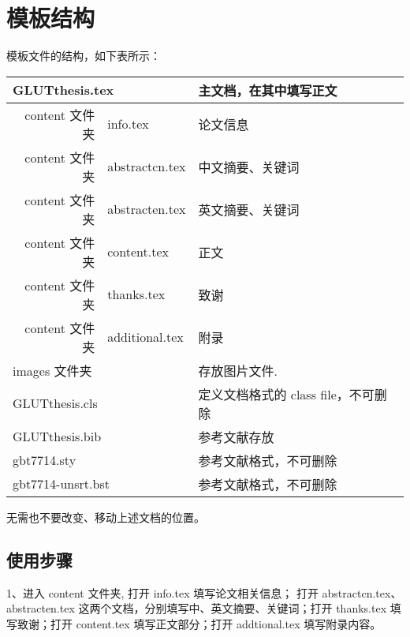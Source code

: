 


\section{模板结构}

模板文件的结构，如下表所示：
\begin{table}[ht]\centering
\begin{tabular}{r|l|l}
	\hline
	\multicolumn{2}{l|}{GLUTthesis.tex }  & 主文档，在其中填写正文  \\ \hline
content 文件夹 & info.tex  & 论文信息  \\ \cline{2-3} \hline
content 文件夹 & abstractcn.tex & 中文摘要、关键词  \\ \hline
content 文件夹 & abstracten.tex & 英文摘要、关键词  \\ \hline
content 文件夹 & content.tex & 正文  \\ \hline
content 文件夹 &  thanks.tex & 致谢  \\ \hline
content 文件夹 & additional.tex & 附录  \\ \hline
	\multicolumn{2}{l|}{images 文件夹}                  & 存放图片文件.                   \\ \hline
	\multicolumn{2}{l|}{GLUTthesis.cls}             & 定义文档格式的 class file，不可删除 \\ \hline
	\multicolumn{2}{l|}{GLUTthesis.bib}             & 参考文献存放 \\ \hline
	\multicolumn{2}{l|}{gbt7714.sty}             & 参考文献格式，不可删除 \\ \hline
	\multicolumn{2}{l|}{gbt7714-unsrt.bst}             & 参考文献格式，不可删除 \\ \hline
\end{tabular}
\end{table}

无需也不要改变、移动上述文档的位置。

 \subsection{使用步骤}

1、进入 content 文件夹,  打开 info.tex 填写论文相关信息；
打开 abstractcn.tex、abstracten.tex 这两个文档，分别填写中、英文摘要、关键词；打开 thanks.tex 填写致谢；打开 content.tex 填写正文部分；打开 addtional.tex 填写附录内容。


